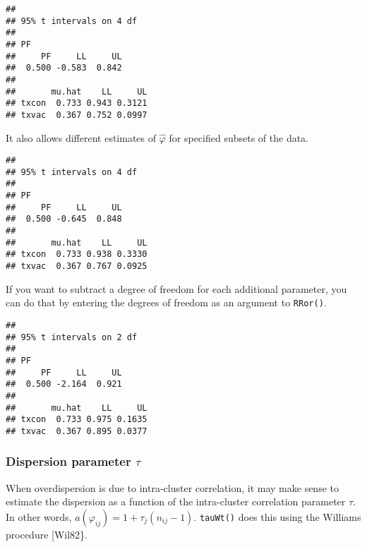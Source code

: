 \documentclass[]{article}
\newenvironment{Shaded}{\begin{snugshade}}{\end{snugshade}}
\newcommand{\KeywordTok}[1]{\textcolor[rgb]{0.13,0.29,0.53}{\textbf{{#1}}}}
\newcommand{\DataTypeTok}[1]{\textcolor[rgb]{0.13,0.29,0.53}{{#1}}}
\newcommand{\DecValTok}[1]{\textcolor[rgb]{0.00,0.00,0.81}{{#1}}}
\newcommand{\CommentTok}[1]{\textcolor[rgb]{0.56,0.35,0.01}{\textit{{#1}}}}
\newcommand{\NormalTok}[1]{{#1}}
\begin{document}
\begin{verbatim}
## 
## 95% t intervals on 4 df
## 
## PF 
##     PF     LL     UL 
##  0.500 -0.583  0.842 
## 
##       mu.hat    LL     UL
## txcon  0.733 0.943 0.3121
## txvac  0.367 0.752 0.0997
\end{verbatim}

\bigskip
It also allows different estimates of \({\hat{\varphi}}\) for specified
subsets of the data. \bigskip

\begin{Shaded}
\end{Shaded}

\begin{verbatim}
## 
## 95% t intervals on 4 df
## 
## PF 
##     PF     LL     UL 
##  0.500 -0.645  0.848 
## 
##       mu.hat    LL     UL
## txcon  0.733 0.938 0.3330
## txvac  0.367 0.767 0.0925
\end{verbatim}

\bigskip
If you want to subtract a degree of freedom for each additional
parameter, you can do that by entering the degrees of freedom as an
argument to \texttt{RRor()}. \bigskip

\begin{Shaded}
\end{Shaded}

\begin{verbatim}
## 
## 95% t intervals on 2 df
## 
## PF 
##     PF     LL     UL 
##  0.500 -2.164  0.921 
## 
##       mu.hat    LL     UL
## txcon  0.733 0.975 0.1635
## txvac  0.367 0.895 0.0377
\end{verbatim}

\subsubsection{Dispersion parameter $\tau$}

When overdispersion is due to intra-cluster correlation, it may make
sense to estimate the dispersion as a function of the intra-cluster
correlation parameter \(\tau\). In other words,
\({a({\varphi }_{ij})}=1+{{\tau }_{j}}({{n}_{ij}}-1)\). \texttt{tauWt()}
does this using the Williams procedure {[}Wil82\}. \bigskip
\end{document}
